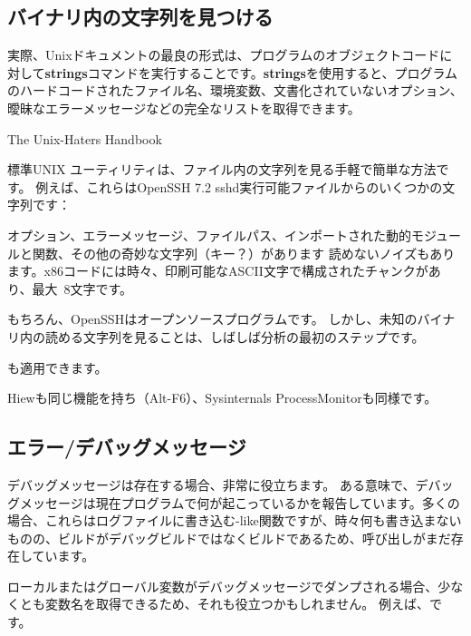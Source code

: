 \label{sec:digging_strings}



\subsection{バイナリ内の文字列を見つける}

\epigraph{実際、Unixドキュメントの最良の形式は、プログラムのオブジェクトコードに対して\textbf{strings}コマンドを実行することです。\textbf{strings}を使用すると、プログラムのハードコードされたファイル名、環境変数、文書化されていないオプション、曖昧なエラーメッセージなどの完全なリストを取得できます。}{The Unix-Haters Handbook}

標準UNIX ユーティリティは、ファイル内の文字列を見る手軽で簡単な方法です。
例えば、これらはOpenSSH 7.2 sshd実行可能ファイルからのいくつかの文字列です：



オプション、エラーメッセージ、ファイルパス、インポートされた動的モジュールと関数、その他の奇妙な文字列（キー？）があります
読めないノイズもあります。x86コードには時々、印刷可能なASCII文字で構成されたチャンクがあり、最大~8文字です。

もちろん、OpenSSHはオープンソースプログラムです。
しかし、未知のバイナリ内の読める文字列を見ることは、しばしば分析の最初のステップです。

も適用できます。

Hiewも同じ機能を持ち（Alt-F6）、Sysinternals ProcessMonitorも同様です。

\subsection{エラー/デバッグメッセージ}

デバッグメッセージは存在する場合、非常に役立ちます。
ある意味で、デバッグメッセージは現在プログラムで何が起こっているかを報告しています。多くの場合、これらはログファイルに書き込む\printf-like関数ですが、時々何も書き込まないものの、ビルドがデバッグビルドではなくビルドであるため、呼び出しがまだ存在しています。
\myindex{\oracle}

ローカルまたはグローバル変数がデバッグメッセージでダンプされる場合、少なくとも変数名を取得できるため、それも役立つかもしれません。
例えば、です。

